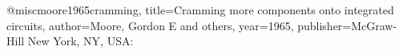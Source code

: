 \begin{thebibliography}{5}
	@misc{moore1965cramming,
		title={Cramming more components onto integrated circuits},
		author={Moore, Gordon E and others},
		year={1965},
		publisher={McGraw-Hill New York, NY, USA:}
	}
\end{thebibliography}